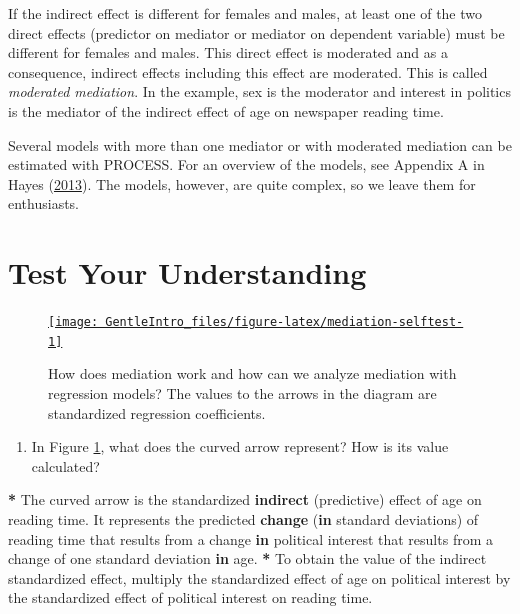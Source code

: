 \documentclass[a4paper]{book}
\newenvironment{Shaded}{\begin{snugshade}}{\end{snugshade}}
\newcommand{\KeywordTok}[1]{\textcolor[rgb]{0,0,0}{\textbf{#1}}}
\newcommand{\StringTok}[1]{\textcolor[rgb]{0.00,0.00,0.00}{#1}}
\newcommand{\ControlFlowTok}[1]{\textcolor[rgb]{0.00,0.00,0.00}{\textbf{#1}}}
\newcommand{\OperatorTok}[1]{\textcolor[rgb]{0.00,0.00,0.00}{\textbf{#1}}}
\newcommand{\NormalTok}[1]{#1}
\providecommand{\tightlist}{%
  \setlength{\itemsep}{0pt}\setlength{\parskip}{0pt}}
\theoremstyle{definition}
\theoremstyle{definition}
\theoremstyle{definition}
\theoremstyle{remark}
\begin{document}
If the indirect effect is different for females and males, at least one
of the two direct effects (predictor on mediator or mediator on
dependent variable) must be different for females and males. This direct
effect is moderated and as a consequence, indirect effects including
this effect are moderated. This is called \emph{moderated mediation}. In
the example, sex is the moderator and interest in politics is the
mediator of the indirect effect of age on newspaper reading time.

Several models with more than one mediator or with moderated mediation
can be estimated with PROCESS. For an overview of the models, see
Appendix A in Hayes (\protect\hyperlink{ref-RefWorks:3873}{2013}). The
models, however, are quite complex, so we leave them for enthusiasts.

\section{Test Your Understanding}\label{test-your-understanding-8}

\begin{figure}[H]
\href{http://82.196.4.233:3838/apps/mediation-commoncause/}{\texttt{[image: GentleIntro\_files/figure-latex/mediation-selftest-1]} }\caption{How does mediation work and how can we analyze mediation with regression models? The values to the arrows in the diagram are standardized regression coefficients.}\label{fig:mediation-selftest}
\end{figure}

\begin{enumerate}
\def\labelenumi{\arabic{enumi}.}
\tightlist
\item
  In Figure \ref{fig:mediation-selftest}, what does the curved arrow
  represent? How is its value calculated?
\end{enumerate}

\begin{Shaded}
\begin{Highlighting}[]
\OperatorTok{*}\StringTok{ }\NormalTok{The curved arrow is the standardized }\KeywordTok{indirect}\NormalTok{ (predictive) effect of age on}
\NormalTok{reading time. It represents the predicted }\KeywordTok{change}\NormalTok{ (}\ControlFlowTok{in}\NormalTok{ standard deviations) of}
\NormalTok{reading time that results from a change }\ControlFlowTok{in}\NormalTok{ political interest that results}
\NormalTok{from a change of one standard deviation }\ControlFlowTok{in}\NormalTok{ age.}
\OperatorTok{*}\StringTok{ }\NormalTok{To obtain the value of the indirect standardized effect, multiply the}
\NormalTok{standardized effect of age on political interest by the standardized effect of}
\NormalTok{political interest on reading time.}
\end{Highlighting}
\end{Shaded}
\end{document}
